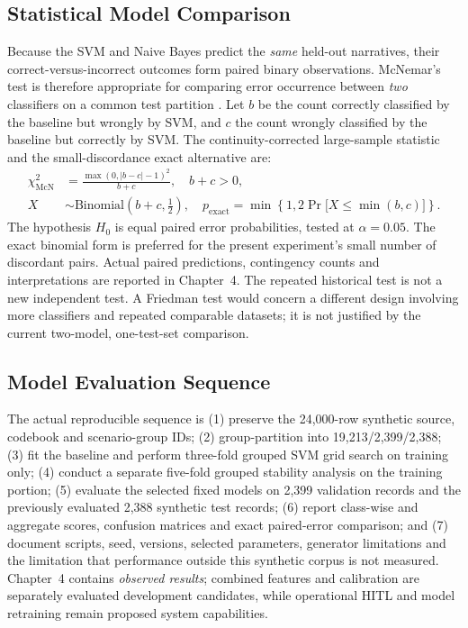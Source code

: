\subsection{Statistical Model Comparison}
Because the SVM and Naive Bayes predict the \emph{same} held-out narratives, their correct-versus-incorrect outcomes form paired binary observations. McNemar's test is therefore appropriate for comparing error occurrence between \emph{two} classifiers on a common test partition \cite{mcnemar_nist}. Let $b$ be the count correctly classified by the baseline but wrongly by SVM, and $c$ the count wrongly classified by the baseline but correctly by SVM. The continuity-corrected large-sample statistic and the small-discordance exact alternative are:
\begin{align}
\chi^2_{\mathrm{McN}} &= \frac{\max(0,|b-c|-1)^2}{b+c},\quad b+c>0,\\
X&\sim\mathrm{Binomial}(b+c,\tfrac12),\quad
p_{\mathrm{exact}}=\min\!\left\{1,2\Pr\big[X\leq\min(b,c)\big]\right\}.
\end{align}
The hypothesis $H_0$ is equal paired error probabilities, tested at $\alpha=0.05$. The exact binomial form is preferred for the present experiment's small number of discordant pairs. Actual paired predictions, contingency counts and interpretations are reported in Chapter~4. The repeated historical test is not a new independent test. A Friedman test would concern a different design involving more classifiers and repeated comparable datasets; it is not justified by the current two-model, one-test-set comparison.

\subsection{Model Evaluation Sequence}
The actual reproducible sequence is (1) preserve the 24,000-row synthetic source, codebook and scenario-group IDs; (2) group-partition into 19,213/2,399/2,388; (3) fit the baseline and perform three-fold grouped SVM grid search on training only; (4) conduct a separate five-fold grouped stability analysis on the training portion; (5) evaluate the selected fixed models on 2,399 validation records and the previously evaluated 2,388 synthetic test records; (6) report class-wise and aggregate scores, confusion matrices and exact paired-error comparison; and (7) document scripts, seed, versions, selected parameters, generator limitations and the limitation that performance outside this synthetic corpus is not measured. Chapter~4 contains \emph{observed results}; combined features and calibration are separately evaluated development candidates, while operational HITL and model retraining remain proposed system capabilities.


